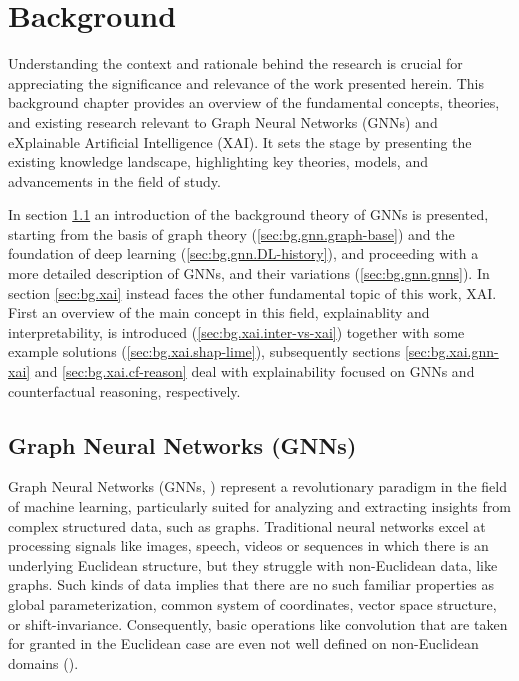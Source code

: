 \documentclass[binding=0.6cm]{sapthesis}
\newcommand{\mycite}[1]{(\cite{#1})}
\begin{document}
\chapter{Background}
\label{chap:2-background}
Understanding the context and rationale behind the research is crucial for appreciating the significance and relevance of the work presented herein. This background chapter provides an overview of the fundamental concepts, theories, and existing research relevant to Graph Neural Networks (GNNs) and eXplainable Artificial Intelligence (XAI). It sets the stage by presenting the existing knowledge landscape, highlighting key theories, models, and advancements in the field of study.

In section \ref{sec:bg.gnn} an introduction of the background theory of GNNs is presented, starting from the basis of graph theory (\cref{sec:bg.gnn.graph-base}) and the foundation of deep learning (\cref{sec:bg.gnn.DL-history}), and proceeding with a more detailed description of GNNs, and their variations (\cref{sec:bg.gnn.gnns}). In section \ref{sec:bg.xai} instead faces the other fundamental topic of this work, XAI. First an overview of the main concept in this field, explainablity and interpretability, is introduced (\cref{sec:bg.xai.inter-vs-xai}) together with some example solutions (\cref{sec:bg.xai.shap-lime}), subsequently sections \ref{sec:bg.xai.gnn-xai} and \ref{sec:bg.xai.cf-reason} deal with explainability focused on GNNs and counterfactual reasoning, respectively.

\section{Graph Neural Networks (GNNs)}
\label{sec:bg.gnn}
Graph Neural Networks (GNNs, \cite{gnnModel2009}) represent a revolutionary paradigm in the field of machine learning, particularly suited for analyzing and extracting insights from complex structured data, such as graphs. Traditional neural networks excel at processing signals like images, speech, videos or sequences in which there is an underlying Euclidean structure, but they struggle with non-Euclidean data, like graphs. Such kinds of data implies that there are no such familiar properties as global parameterization, common system of coordinates, vector space structure, or shift-invariance. Consequently, basic operations like convolution that are taken for granted in the Euclidean case are even not well defined on non-Euclidean domains \mycite{Bronstein_2017}. 
\end{document}
